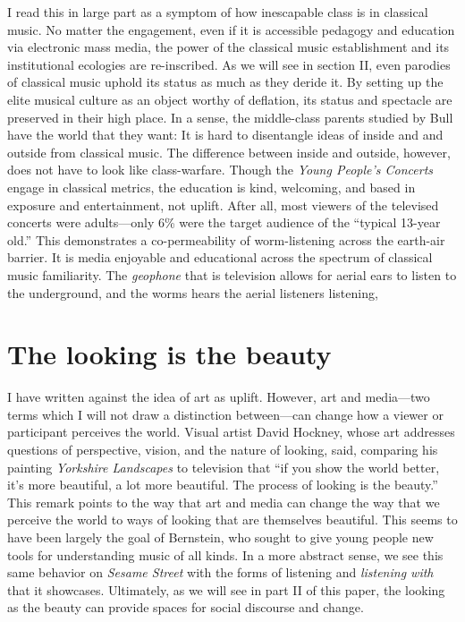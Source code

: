 \documentclass[12pt,letterpaper]{article}
\newcommand{\ses}{\textit{Sesame Street }}
\begin{document}
	I read this in large part as a symptom of how inescapable class is in 
	classical music. No matter the engagement, even if it is accessible 
	pedagogy and education via electronic mass media, the power of the 
	classical music
	establishment and its institutional ecologies are re-inscribed. As
	we will see in section II, even parodies of classical music 
	uphold its status as much as they deride it. By 
	setting up the elite musical culture as an object worthy of deflation,
	its status and spectacle are preserved in their high 
	place.\autocite[252]{Garrett} In a sense, the middle-class parents 
	studied by Bull have the world that they want: It is hard to disentangle
	ideas of inside and and outside from classical music. The difference
	between inside and outside, however, does not have to look like
	class-warfare. Though the \textit{Young People's Concerts} engage in 
	classical metrics, the education is kind, welcoming, and 
	based in exposure and entertainment, not uplift. After all, most viewers
	of the televised concerts were adults---only 6\% were the
	target audience of the ``typical 13-year old.''\autocite[2]{Kopfstein}    
	This demonstrates a co-permeability of worm-listening across the
	earth-air barrier. It is media enjoyable and educational across the
	spectrum of classical music familiarity. The \textit{geophone} that is
	television allows for aerial ears to listen to the underground, and the
	worms hears the aerial listeners listening,    

	\section*{The looking is the beauty}
	
	I have written against the idea of art as uplift. However, art and
	media---two terms which I will not draw a distinction between---can
	change how a viewer or participant perceives the world. Visual artist
	David Hockney, whose art addresses questions of perspective, vision, 
	and the nature of looking, said, comparing his painting 
	\textit{Yorkshire Landscapes} to television that ``if you show the world
	better, it's more beautiful, a lot more beautiful. The process of 
	looking is the beauty.''\autocite[100]{Odell} This remark points to the
	way that art and media can change the way that we perceive the world to
	ways of looking that are themselves beautiful. This seems to have been
	largely the goal of Bernstein, who sought to give young people new tools
	for understanding music of all kinds. In a more abstract sense, we see
	this same behavior on \ses with the forms of listening and 
	\textit{listening with} that it showcases. Ultimately, as we will
	see in part II of this paper, the looking as the beauty can provide
	spaces for social discourse and change. 
\end{document}
